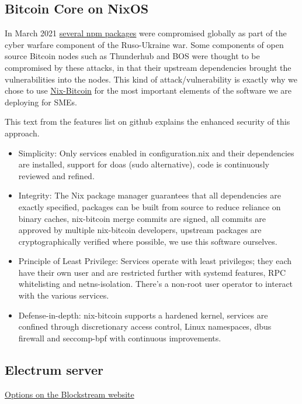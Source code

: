 \subsection{Bitcoin Core on NixOS}
In March 2021 \href{https://www.whitesourcesoftware.com/whitesource-npm-threat-report-for-javascript-package-registry/}{several npm packages} were compromised globally as part of the cyber warfare component of the Ruso-Ukraine war. Some components of open source Bitcoin nodes such as Thunderhub and BOS were thought to be compromised by these attacks, in that their upstream dependencies brought the vulnerabilities into the nodes. This kind of attack/vulnerability is exactly why we chose to use \href{https://github.com/fort-nix/nix-bitcoin/#features}{Nix-Bitcoin} for the most important elements of the software we are deploying for SMEs.\par
This text from the features list on github explains the enhanced security of this approach.
\begin{itemize}
\item Simplicity: Only services enabled in configuration.nix and their dependencies are installed, support for doas (sudo alternative), code is continuously reviewed and refined.
\item Integrity: The Nix package manager guarantees that all dependencies are exactly specified, packages can be built from source to reduce reliance on binary caches, nix-bitcoin merge commits are signed, all commits are approved by multiple nix-bitcoin developers, upstream packages are cryptographically verified where possible, we use this software ourselves.
\item Principle of Least Privilege: Services operate with least privileges; they each have their own user and are restricted further with systemd features, RPC whitelisting and netns-isolation. There's a non-root user operator to interact with the various services.
\item Defense-in-depth: nix-bitcoin supports a hardened kernel, services are confined through discretionary access control, Linux namespaces, dbus firewall and seccomp-bpf with continuous improvements.
\end{itemize}
\subsection{Electrum server}
\href{https://blog.blockstream.com/en-esplora-and-other-alternatives-to-electrumx/}{Options on the Blockstream website}
\lipsum[50]
